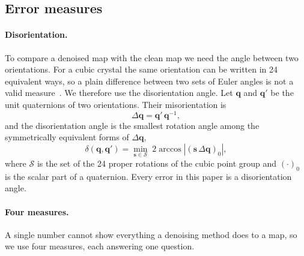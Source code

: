
\subsection{Error measures}
\label{sec:metrics}

\paragraph{Disorientation.}
To compare a denoised map with the clean map we need the angle between two
orientations. For a cubic crystal the same orientation can be written in 24
equivalent ways, so a plain difference between two sets of Euler angles is not
a valid measure~\cite{atindama2023restoration,ding2020indexing}. We therefore
use the disorientation angle. Let $\mathbf{q}$ and $\mathbf{q}'$ be the unit
quaternions of two orientations. Their misorientation is
\begin{equation}
  \Delta\mathbf{q} = \mathbf{q}'\,\mathbf{q}^{-1},
  \label{eq:misorientation}
\end{equation}
and the disorientation angle is the smallest rotation angle among the
symmetrically equivalent forms of $\Delta\mathbf{q}$,
\begin{equation}
  \delta(\mathbf{q}, \mathbf{q}') = \min_{\mathbf{s} \in \mathcal{S}}
  \; 2 \arccos \left| \left( \mathbf{s}\, \Delta\mathbf{q} \right)_0 \right|,
  \label{eq:disorientation}
\end{equation}
where $\mathcal{S}$ is the set of the 24 proper rotations of the cubic point
group and $(\cdot)_0$ is the scalar part of a quaternion. Every error in this
paper is a disorientation angle.

\paragraph{Four measures.}
A single number cannot show everything a denoising method does to a map, so
we use four measures, each answering one question.


